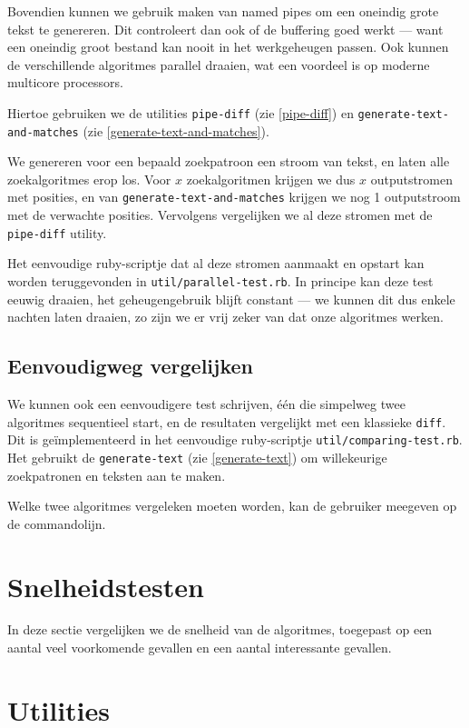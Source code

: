 \documentclass[a4paper,11pt]{article}
\begin{document}
Bovendien kunnen we gebruik maken van named pipes om een oneindig grote tekst
te genereren. Dit controleert dan ook of de buffering goed werkt — want een
oneindig groot bestand kan nooit in het werkgeheugen passen. Ook kunnen de
verschillende algoritmes parallel draaien, wat een voordeel is op moderne
multicore processors.

Hiertoe gebruiken we de utilities \verb#pipe-diff# (zie \ref{pipe-diff}) en
\verb#generate-text-and-matches# (zie \ref{generate-text-and-matches}).

We genereren voor een bepaald zoekpatroon een stroom van tekst, en laten
alle zoekalgoritmes erop los. Voor $x$ zoekalgoritmen krijgen we dus $x$
outputstromen met posities, en van \verb#generate-text-and-matches# krijgen we
nog 1 outputstroom met de verwachte posities. Vervolgens vergelijken we al deze
stromen met de \verb#pipe-diff# utility.

Het eenvoudige ruby-scriptje dat al deze stromen aanmaakt en opstart kan worden
teruggevonden in \verb#util/parallel-test.rb#. In principe kan deze test eeuwig
draaien, het geheugengebruik blijft constant — we kunnen dit dus enkele
nachten laten draaien, zo zijn we er vrij zeker van dat onze algoritmes werken.

\subsection{Eenvoudigweg vergelijken}

We kunnen ook een eenvoudigere test schrijven, \'e\'en die simpelweg twee
algoritmes sequentieel start, en de resultaten vergelijkt met een klassieke
\verb#diff#. Dit is ge\"implementeerd in het eenvoudige ruby-scriptje
\verb#util/comparing-test.rb#. Het gebruikt de \verb#generate-text# (zie
\ref{generate-text}) om willekeurige zoekpatronen en teksten aan te maken.

Welke twee algoritmes vergeleken moeten worden, kan de gebruiker meegeven op de
commandolijn.

\section{Snelheidstesten}

In deze sectie vergelijken we de snelheid van de algoritmes, toegepast op een
aantal veel voorkomende gevallen en een aantal interessante gevallen.

\section{Utilities}
\end{document}
